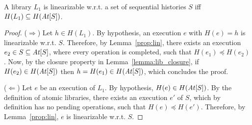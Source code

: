 



\begin{proposition}

A library $L_1$ is linearizable w.r.t. a set of sequential histories $S$ iff $H(L_1)\subseteq H(\mathit{At}[{S}])$.

\end{proposition}

\begin{proof}

($\Rightarrow$) Let $h\in H(L_1)$. By hypothesis, an execution $e$ with $H(e)=h$ is linearizable w.r.t. $S$.
Therefore, by Lemma~\ref{prop:lin}, there exists an execution $e_2\in S\subseteq  \mathit{At}[{S}]$, where every operation is completed, 
such that $H(e_1)\preceq H(e_2)$. Now, by the closure property in Lemma~\ref{lemma:lib_closure}, if $H(e_2)\in H(\mathit{At}[{S}])$
then $h=H(e_1)\in H(\mathit{At}[{S}])$, which concludes the proof.

($\Leftarrow$) Let $e$ be an execution of $L_1$. By hypothesis, $H(e)\in H(\mathit{At}[{S}])$. 
By the definition of atomic libraries, %
there exists an execution $e'$ of $S$, which by definition has no pending operations, such that $H(e)\preceq H(e')$.
%
Therefore, by Lemma~\ref{prop:lin}, $e$ is linearizable w.r.t. $S$.

\end{proof}


%
%
%
